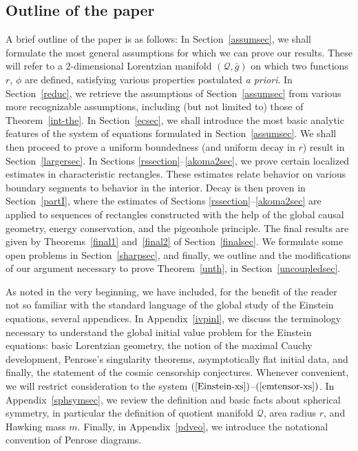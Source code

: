 \documentclass{article}
\begin{document}
\subsection{Outline of the paper}
\label{outl}
A brief outline of the paper is as follows: In Section~\ref{assumsec},
we shall formulate the most general assumptions for which we can prove our results.
These will refer to a $2$-dimensional Lorentzian manifold
$(\mathcal{Q},\bar{g})$ on which two functions $r$, $\phi$ are
defined, satisfying various properties postulated \emph{a priori}.
In Section~\ref{reduc}, we retrieve the assumptions of Section~\ref{assumsec} 
from various more recognizable assumptions, including (but not limited
to) those of Theorem~\ref{int-the}. In Section~\ref{ecsec},
we shall introduce the most basic analytic features of the system of equations
formulated in Section~\ref{assumsec}. We shall then proceed
to prove a uniform boundedness (and uniform decay in $r$) result in
Section~\ref{largersec}. In Sections \ref{rssection}--\ref{akoma2sec},
we prove certain localized estimates in characteristic rectangles. 
These estimates relate behavior on various boundary segments to behavior 
in the interior. Decay is then proven in Section~\ref{partI},
where the estimates of Sections \ref{rssection}--\ref{akoma2sec} are applied to sequences
of rectangles constructed with the help of the global causal geometry, energy conservation,
and the pigeonhole principle. The final results are given by Theorems~\ref{final1} and~\ref{final2} of 
Section~\ref{finalsec}. We formulate some open problems in 
Section~\ref{sharpsec}, and finally, we outline and the modifications 
of our argument necessary to prove Theorem~\ref{unth}, in
Section~\ref{uncoupledsec}.

As noted in the very beginning, we have included,
for the benefit of the reader not so familiar with the standard language of
the global study of the Einstein equations, several appendices. 
In Appendix~\ref{ivpinl}, we discuss the terminology necessary to understand
the global initial value problem for the Einstein equations:
basic Lorentzian geometry, the notion of the maximal Cauchy development,
Penrose's singularity theorems, asymptotically flat initial data,
and finally, the statement of the cosmic censorship conjectures.
Whenever convenient, we will restrict consideration to
the system $(\ref{Einstein-xs})$--$(\ref{emtensor-xs})$.  
In Appendix~\ref{sphsymsec}, we review the definition and basic facts about 
spherical symmetry, in particular the definition of quotient manifold $\mathcal{Q}$,
area radius $r$, and Hawking mass $m$. Finally, in Appendix~\ref{pdveo}, we introduce 
the notational convention of Penrose diagrams.
\end{document}
